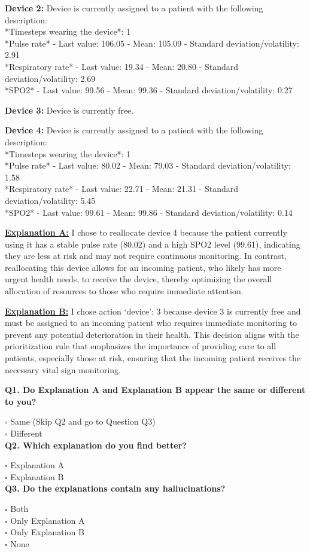 \textbf{Device 2:} Device is currently assigned to a patient with the following description: \\
*Timesteps wearing the device*: 1 \\
*Pulse rate* - Last value: 106.05 - Mean: 105.09 - Standard deviation/volatility: 2.91 \\
*Respiratory rate* - Last value: 19.34 - Mean: 20.80 - Standard deviation/volatility: 2.69 \\
*SPO2* - Last value: 99.56 - Mean: 99.36 - Standard deviation/volatility: 0.27 

\textbf{Device 3:} Device is currently free. 

\textbf{Device 4:} Device is currently assigned to a patient with the following description: \\
*Timesteps wearing the device*: 1 \\
*Pulse rate* - Last value: 80.02 - Mean: 79.03 - Standard deviation/volatility: 1.58 \\
*Respiratory rate* - Last value: 22.71 - Mean: 21.31 - Standard deviation/volatility: 5.45 \\
*SPO2* - Last value: 99.61 - Mean: 99.86 - Standard deviation/volatility: 0.14


\underline{\textbf{Explanation A:}} I chose to reallocate device 4 because the patient currently using it has a stable pulse rate (80.02) and a high SPO2 level (99.61), indicating they are less at risk and may not require continuous monitoring. In contrast, reallocating this device allows for an incoming patient, who likely has more urgent health needs, to receive the device, thereby optimizing the overall allocation of resources to those who require immediate attention.

\underline{\textbf{Explanation B:}} I chose action {`device': 3} because device 3 is currently free and must be assigned to an incoming patient who requires immediate monitoring to prevent any potential deterioration in their health. This decision aligns with the prioritization rule that emphasizes the importance of providing care to all patients, especially those at risk, ensuring that the incoming patient receives the necessary vital sign monitoring.



\textbf{Q1.  Do Explanation A and Explanation B appear the same or different to you?}

\noindent
$\square$ Same (Skip Q2 and go to Question Q3) \\
$\square$ Different \\

\textbf{Q2. Which explanation do you find better?}

\noindent
$\square$ Explanation A \\
$\square$ Explanation B \\


\textbf{Q3. Do the explanations contain any hallucinations?}

\noindent
$\square$ Both \\
$\square$ Only Explanation A \\
$\square$ Only Explanation B \\
$\square$ None \\